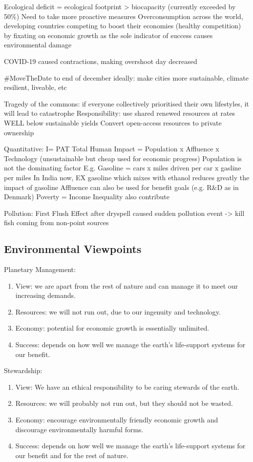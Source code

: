 \documentclass[12pt, a4paper]{article}
\begin{document}
\begin{multicols*}{3}
Ecological deficit = ecological footprint > biocapacity (currently exceeded by 50\%)
Need to take more proactive measures
Overconsumption across the world, developing countries competing to boost their economies (healthy competition) by fixating on economic growth as the sole indicator of success causes environmental damage

COVID-19 caused contractions, making overshoot day decreased

\#MoveTheDate to end of december ideally: make cities more sustainable, climate resilient, liveable, etc

Tragedy of the commons: if everyone collectively prioritised their own lifestyles, it will lead to catastrophe
Responsibility: use shared renewed resources at rates WELL below sustainable yields 
Convert open-access resources to private ownership


Quantitative: I= PAT 
Total Human Impact = Population x Affluence x Technology (unsustainable but cheap used for economic progress)
Population is not the dominating factor
E.g. Gasoline = cars x miles driven per car x gasline per miles
In India now, EX gasoline which mixes with ethanol reduces greatly the impact of gasoline
Affluence can also be used for benefit goals (e.g. R\&D as in Denmark)
Poverty = Income Inequality also contribute 

Pollution:
First Flush Effect after dryspell caused sudden pollution event -> kill fish coming from non-point sources 
\subsection{Environmental Viewpoints}

Planetary Management:
\begin{enumerate}[\roman*.]
  \item View: we are apart from the rest of nature and can manage it to meet our increasing demands.
  \item Resources: we will not run out, due to our ingenuity and technology.
  \item Economy: potential for economic growth is essentially unlimited.
  \item Success: depends on how well we manage the earth's life-support systems for our benefit.
\end{enumerate}

Stewardship:
\begin{enumerate}[\roman*.]
  \item View: We have an ethical responsibility to be caring stewards of the earth.
  \item Resources: we will probably not run out, but they should not be wasted.
  \item Economy: encourage environmentally friendly economic growth and discourage environmentally harmful forms.
  \item Success: depends on how well we manage the earth's life-support systems for our benefit and for the rest of nature.
\end{enumerate}


\end{multicols*}
\end{document}
